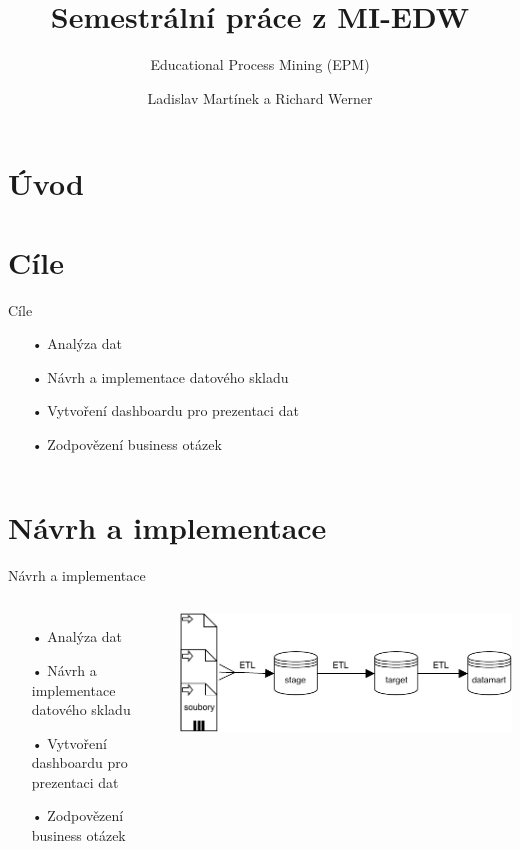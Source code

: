 \documentclass[aspectratio=169,28pt]{beamer}
\title{Semestrální práce z MI-EDW}
\subtitle{Educational Process Mining (EPM)}
\author{Ladislav Martínek a Richard Werner}
\date {}
\begin{document}
\section{Úvod}
\begin{frame}
\titlepage
\end{frame}

\section{Cíle}
\begin{frame}{Cíle}
\begin{itemize}
        \item[•] Analýza dat
		\item[•] Návrh a implementace datového skladu
		\item[•] Vytvoření dashboardu pro prezentaci dat
		\item[•] Zodpovězení business otázek
		\end{itemize}
\begin{columns}[c]
    \column{5cm}
    \column{10cm}
 \end{columns}   
      
\end{frame}

\section{Návrh a implementace}
\begin{frame}{Návrh a implementace}
		\begin{columns}[c]
    \column{8cm}
    \begin{itemize}
        \item[•] Analýza dat
		\item[•] Návrh a implementace datového skladu
		\item[•] Vytvoření dashboardu pro prezentaci dat
		\item[•] Zodpovězení business otázek
		\end{itemize}
    \column{7cm}
    \includegraphics[scale=0.58]{img/DW}
 \end{columns}   
\end{frame}
\end{document}
